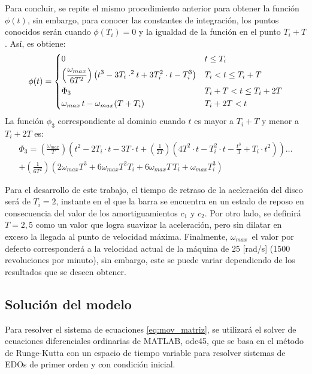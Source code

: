 Para concluir, se repite el mismo procedimiento anterior para obtener la función $\phi (t)$, sin embargo, para conocer las constantes de integración, los puntos conocidos serán cuando $\phi(T_i) = 0$ y la igualdad de la función en el punto $T_i + T$. Así, es obtiene:
\[ \phi (t) =
\begin{dcases}
	0																									&	t \leq T_i \\
	\left(\frac{\omega_{max}}{6T^2}\right)\left(t^3 - 3T_i\cdot^2 t + 3T_i^2\cdot t - T_i^3\right)		&	T_i < t \leq T_i + T\\
	\Phi_3																								&	T_i + T < t \leq T_i + 2T\\
	\omega_{max}\, t - \omega_{max}(T + T_i)															&	T_i + 2T < t\\
\end{dcases} 
\]
La función $\phi_3$ correspondiente al dominio cuando $t$ es mayor a $T_i + T$ y menor a $T_i  + 2T$ es:
\begin{multline*}
\Phi_3 = \left(\frac{\omega_{max}}{T}\right)\left(t^2 - 2T_i\cdot t - 3T\cdot t + \left(\frac{1}{2T}\right)\left(4T^2\cdot t - T_i^2\cdot t - \frac{t^3}{3} + T_i\cdot t^2\right)\right)\dots \\
 + \left(\frac{1}{6T^2}\right) \left(2\omega_{max}T^3 + 6\omega_{max}T^2T_i + 6\omega_{max}T\,T_i + \omega_{max}T_i^3\right)
\end{multline*}

Para el desarrollo de este trabajo, el tiempo de retraso de la aceleración del disco será de $T_i=2$, instante en el que la barra se encuentra en un estado de reposo en consecuencia del valor de los amortiguamientos $c_1$ y $c_2$. Por otro lado, se definirá $T = 2,5$ como un valor que logra suavizar la aceleración, pero sin dilatar en exceso la llegada al punto de velocidad máxima. Finalmente, $\omega_{max}\,$ el valor por defecto corresponderá a la velocidad actual de la máquina de 25 [rad/s] (1500 revoluciones por minuto), sin embargo, este se puede variar dependiendo de los resultados que se deseen obtener. 

\subsection{Solución del modelo}
Para resolver el sistema de ecuaciones \ref{eq:mov_matriz}, se utilizará el solver de ecuaciones diferenciales ordinarias de MATLAB, ode45, que se basa en el método de Runge-Kutta con un espacio de tiempo variable para resolver sistemas de EDOs de primer orden y con condición inicial. \cite{ode45}

